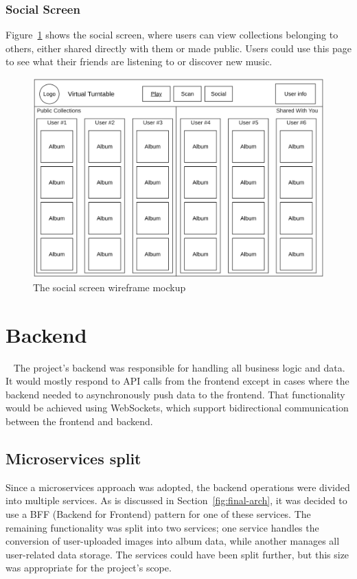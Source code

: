 \subsubsection{Social Screen}
Figure~\ref{fig:social_screen_mockup} shows the social screen, where users can view collections belonging to others, either shared directly with them or made public. Users could use this page to see what their friends are listening to or discover new music.

\begin{figure} [H]
    \centering
    \includegraphics[width=0.6\linewidth]{figures/social_screen_mockup.png}
    \caption{The social screen wireframe mockup}
    \label{fig:social_screen_mockup}
\end{figure}

\section{Backend}~\label{sec:backend-design}
The project's backend was responsible for handling all business logic and data. It would mostly respond to API calls from the frontend except in cases where the backend needed to asynchronously push data to the frontend. That functionality would be achieved using WebSockets, which support bidirectional communication between the frontend and backend.

\subsection{Microservices split}
Since a microservices approach was adopted, the backend operations were divided into multiple services. As is discussed in Section~\ref{fig:final-arch}, it was decided to use a BFF (Backend for Frontend) pattern for one of these services. The remaining functionality was split into two services; one service handles the conversion of user-uploaded images into album data, while another manages all user-related data storage. The services could have been split further, but this size was appropriate for the project's scope.

